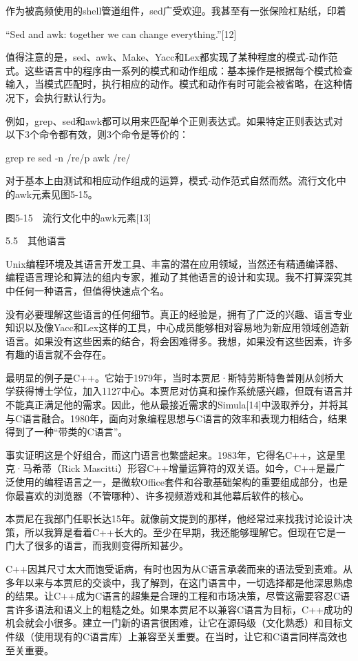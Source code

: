 \documentclass[a4paper,12pt,UTF8,twoside]{ctexbook}
\begin{document}
{{作为被高频使用的shell管道组件，sed广受欢迎。我甚至有一张保险杠贴纸，印着

“Sed and awk: together we can change everything.”[12]

值得注意的是，sed、awk、Make、Yacc和Lex都实现了某种程度的模式-动作范式。这些语言中的程序由一系列的模式和动作组成：基本操作是根据每个模式检查输入，当模式匹配时，执行相应的动作。模式和动作有时可能会被省略，在这种情况下，会执行默认行为。

例如，grep、sed和awk都可以用来匹配单个正则表达式。如果特定正则表达式对以下3个命令都有效，则3个命令是等价的：

grep re sed -n /re/p awk /re/

对于基本上由测试和相应动作组成的运算，模式-动作范式自然而然。流行文化中的awk元素见图5-15。



图5-15　流行文化中的awk元素[13]





5.5　其他语言


Unix编程环境及其语言开发工具、丰富的潜在应用领域，当然还有精通编译器、编程语言理论和算法的组内专家，推动了其他语言的设计和实现。我不打算深究其中任何一种语言，但值得快速点个名。

没有必要理解这些语言的任何细节。真正的经验是，拥有了广泛的兴趣、语言专业知识以及像Yacc和Lex这样的工具，中心成员能够相对容易地为新应用领域创造新语言。如果没有这些因素的结合，将会困难得多。我想，如果没有这些因素，许多有趣的语言就不会存在。

最明显的例子是C++。它始于1979年，当时本贾尼·斯特劳斯特鲁普刚从剑桥大学获得博士学位，加入1127中心。本贾尼对仿真和操作系统感兴趣，但既有语言并不能真正满足他的需求。因此，他从最接近需求的Simula[14]中汲取养分，并将其与C语言融合。1980年，面向对象编程思想与C语言的效率和表现力相结合，结果得到了一种“带类的C语言”。

事实证明这是个好组合，而这门语言也繁盛起来。1983年，它得名C++，这是里克·马希蒂（Rick Mascitti）形容C++增量运算符的双关语。如今，C++是最广泛使用的编程语言之一，是微软Office套件和谷歌基础架构的重要组成部分，也是你最喜欢的浏览器（不管哪种）、许多视频游戏和其他幕后软件的核心。

本贾尼在我部门任职长达15年。就像前文提到的那样，他经常过来找我讨论设计决策，所以我算是看着C++长大的。至少在早期，我还能够理解它。但现在它是一门大了很多的语言，而我则变得所知甚少。

C++因其尺寸太大而饱受诟病，有时也因为从C语言承袭而来的语法受到责难。从多年以来与本贾尼的交谈中，我了解到，在这门语言中，一切选择都是他深思熟虑的结果。让C++成为C语言的超集是合理的工程和市场决策，尽管这需要容忍C语言许多语法和语义上的粗糙之处。如果本贾尼不以兼容C语言为目标，C++成功的机会就会小很多。建立一门新的语言很困难，让它在源码级（文化熟悉）和目标文件级（使用现有的C语言库）上兼容至关重要。在当时，让它和C语言同样高效也至关重要。

}}
\end{document}
